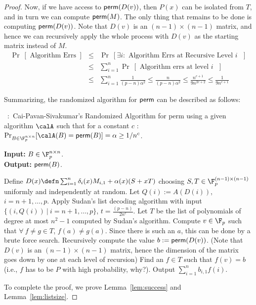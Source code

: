 \begin{proof}
Now, if we have access to ${\sf perm}(D(v))$, then $P(x)$ can be isolated from $T$, and in turn we can compute ${\sf perm}(M)$. The only thing that remains to be done is computing ${\sf perm}(D(v))$. Note that $D(v)$ is an $(n-1)\times (n-1)$ matrix, and hence we can recursively apply the whole process with $D(v)$ as the starting matrix instead of $M$.
\begin{eqnarray*}
\Pr~[\textrm{ Algorithm Errs }] & \le & \Pr~[ \exists i : \textrm { Algorithm Errs at Recursive Level $i$ } ] \\
& \le & \sum_{i=1}^{n} \Pr~[\textrm{ Algorithm errs at level $i$ }] \\
& \le & \sum_{i=1}^n \frac{1}{(p-n)\alpha^2} \le \frac{n}{(p-n)\alpha^2} \le \frac{n^{c+1}}{9n^{2c+2}} \le \frac{1}{9n^{c+1}} 
\end{eqnarray*}

Summarizing, the  randomized algorithm for ${\sf perm}$  can be described as follows:

\begin{algorithm}
\label{alg:rand-algo-perm1}
\caption{~:~Cai-Pavan-Sivakumar's\cite{CPS99} Randomized Algorithm for {\sf 
perm} using a given algorithm $\calA$ such that for a constant $c$ : $\Pr_{B \in \F_p^{n \times n}}[\calA(B)= {\sf perm}(B)]= \alpha \ge 1/n^c$.
}
{\bf Input:} $B \in \F_p^{n \times n}$.\\
{\bf Output: } ${\sf perm}(B)$.
\begin{algorithmic}[1]
\State  Define $D(x) \defn \sum_{i=1}^n \delta_i(x)M_{i,1}+\alpha(x)(S+xT)$
choosing $S,T \in \F_p^{(n-1) \times (n-1)}$ uniformly and independently at random.
\State Let $Q(i):= A(D(i))$, $i=n+1,\ldots, p$.
\State Apply Sudan's list decoding algorithm  with input $\{(i, Q(i))~|~i=n+1,\ldots, p\}$, $t=\frac{(p-n)}{2n^c}$.
Let $T$ be the list of polynomials of degree at most $n^2-1$ computed by Sudan's algorithm.
\State Compute $v\in \F_p$ such that $ \forall~f\neq g \in T$, $f(a)\neq g(a)$. Since there is such an $a$, this can be done by a brute force search.
\State  Recursively compute the value $b:={\sf perm}(D(v))$. (Note that $D(v)$ is an $(n-1)\times (n-1)$ matrix, hence the dimension of the matrix goes down by one at each level of recursion)
\State Find an $f\in T$ such that $f(v)=b$ (i.e., $f$ has to be $P$ with high probability, why?).
\State Output $\sum_{i=1}^n b_{i,1}f(i)$. 
\end{algorithmic}
\end{algorithm}

\noindent To complete the proof, we prove Lemma~\ref{lem:success} and Lemma~\ref{lem:listsize}.


\end{proof}
